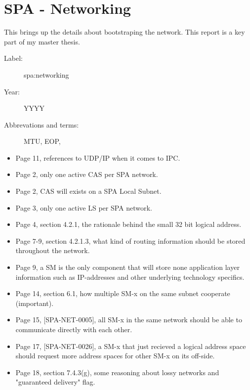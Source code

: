 \section{SPA - Networking}

This brings up the details about bootstraping the network. This report is a key
part of my master thesis.

\begin{description}
    \item[Label:] spa:networking \cite{spa:networking}
    \item[Year:] YYYY
    \item[Abbrevations and terms:]
        MTU,
        EOP,
\end{description}

\begin{itemize}
    \item Page 11, references to UDP/IP when it comes to IPC.
    \item Page 2, only one active CAS per SPA network.
    \item Page 2, CAS will exists on a SPA Local Subnet.
    \item Page 3, only one active LS per SPA network.
    \item Page 4, section 4.2.1, the rationale behind the small 32 bit logical
        address.
    \item Page 7-9, section 4.2.1.3, what kind of routing information should be
        stored throughout the network.
    \item Page 9, a SM is the only component that will store none application
        layer information such as IP-addresses and other underlying technology
        specifics.
    \item Page 14, section 6.1, how multiple SM-x on the same subnet cooperate
        (important).
    \item Page 15, [SPA-NET-0005], all SM-x in the same network should be able
        to communicate directly with each other.
    \item Page 17, [SPA-NET-0026], a SM-x that just recieved a logical address
        space should request more address spaces for other SM-x on its
        off-side.
    \item Page 18, section 7.4.3(g), some reasoning about lossy networks and
        "guaranteed delivery" flag.
\end{itemize}

